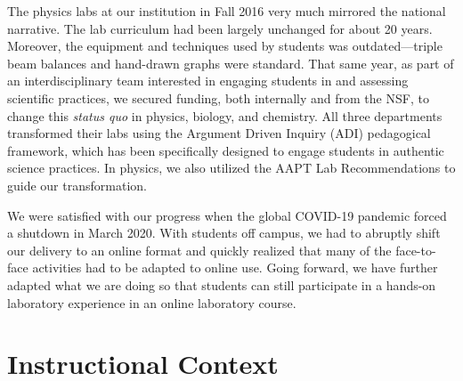 \documentclass[aip, numerical, preprint]{revtex4-2}
\begin{document}

The physics labs at our institution in Fall 2016 very much mirrored the national narrative.
The lab curriculum had been largely unchanged for about 20 years. Moreover, the equipment and
techniques used by students was outdated---triple beam balances and hand-drawn graphs were
standard.  That same year, as part of an interdisciplinary team interested in engaging students
in and assessing scientific practices, we secured funding, both internally and from the NSF, to
change this \emph{status quo} in physics, biology, and chemistry.  All three departments
transformed their labs using the Argument Driven Inquiry
(ADI)\citep{Sampson2011,Walker2011,Walker2016} pedagogical framework, which has been
specifically designed to engage students in authentic science practices. In physics, we also
utilized the AAPT Lab Recommendations to guide our transformation.\citep{kozminski2014aapt}

We were satisfied with our progress when the global COVID-19 pandemic forced a shutdown in
March 2020.  With students off campus, we had to abruptly shift our delivery to an online
format and quickly realized that many of the face-to-face activities had to be adapted to
online use.  Going forward, we have further adapted what we are doing so that students can
still participate in a hands-on laboratory experience in an online laboratory course.


\section{Instructional Context}
\end{document}
